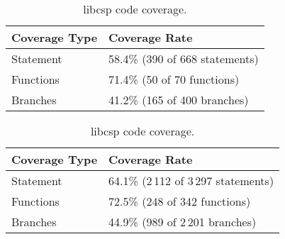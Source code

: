 
\begin{table}[h]

\footnotesize
\parbox{.45\linewidth}{
\centering
\begin{tabular}{|l|l|}
\hline
\textbf{Coverage Type} & \textbf{Coverage Rate} \\
\hline
Statement     & 58.4\% (390 of 668 statements)\\
Functions     & 71.4\% (50 of 70 functions)\\
Branches      & 41.2\% (165 of 400 branches)\\
\hline
\end{tabular}
\caption{libgscsp code coverage.}
\label{table:libgscsp_coverage}
}
\hfill
\parbox{.45\linewidth}{
\centering
\begin{tabular}{|l|l|}
\hline
\textbf{Coverage Type} & \textbf{Coverage Rate} \\
\hline
Statement     & 64.1\% (2\,112 of 3\,297 statements)\\
Functions     & 72.5\% (248 of 342 functions)\\
Branches      & 44.9\% (989 of 2\,201 branches)\\
\hline
\end{tabular}
\caption{libcsp code coverage.}
\label{table:libcsp_coverage}
}
\end{table}